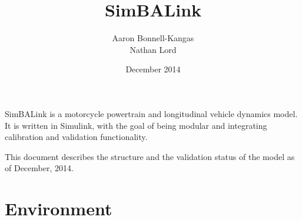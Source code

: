 \documentclass{article}
\begin{document}
\title{SimBALink}
\author{Aaron Bonnell-Kangas \\ Nathan Lord}
\date{December 2014}
\maketitle

SimBALink is a motorcycle powertrain and longitudinal vehicle dynamics model. It is written in Simulink, with the goal of being modular and integrating calibration and validation functionality.

This document describes the structure and the validation status of the model as of December, 2014. 

\tableofcontents



\section{Environment}


\end{document}

